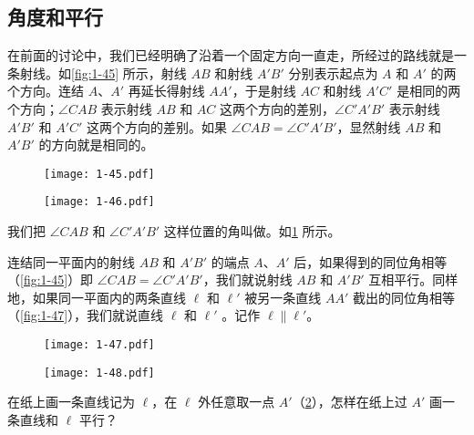\subsection{角度和平行}
在前面的讨论中，我们已经明确了沿着一个固定方向一直走，所经过的路线就是一条射线。如\cref{fig:1-45} 所示，射线 $AB$ 和射线 $A'B'$ 分别表示起点为 $A$ 和 $A'$ 的两个方向。连结 $A$、$A'$ 再延长得射线 $AA'$，于是射线 $AC$ 和射线 $A'C'$ 是相同的两个方向；$\angle CAB$ 表示射线 $AB$ 和 $AC$ 这两个方向的差别，$\angle C'A'B'$ 表示射线 $A'B'$ 和 $A'C'$ 这两个方向的差别。如果 $\angle CAB=\angle C'A'B'$，显然射线 $AB$ 和 $A'B'$ 的方向就是相同的。

\begin{figure}
	\begin{minipage}[b]{0.48\linewidth}
		\centering
    \texttt{[image: 1-45.pdf]}
		\caption{}\label{fig:1-45}
	\end{minipage}
	\begin{minipage}[b]{0.48\linewidth}
		\centering
		\texttt{[image: 1-46.pdf]}
		\caption{}\label{fig:1-46}
	\end{minipage}
\end{figure}


我们把 $\angle CAB$ 和 $\angle C'A'B'$ 这样位置的角叫做。如\cref{fig:1-46} 所示。

连结同一平面内的射线 $AB$ 和 $A'B'$ 的端点 $A$、$A'$ 后，如果得到的同位角相等（\cref{fig:1-45}）即 $\angle CAB=\angle C'A'B'$，我们就说射线 $AB$ 和 $A'B'$ 互相平行。同样地，如果同一平面内的两条直线 $\ell$ 和 $\ell'$ 被另一条直线 $AA'$ 截出的同位角相等（\cref{fig:1-47}），我们就说直线 $\ell$ 和 $\ell'$ 。记作 $\ell\parallel \ell'$。

\begin{figure}
    \begin{minipage}[b]{0.48\linewidth}
    	\centering
			\texttt{[image: 1-47.pdf]}
    	\caption{}\label{fig:1-47}
    \end{minipage}
    \begin{minipage}[b]{0.48\linewidth}
    	\centering
			\texttt{[image: 1-48.pdf]}
    \caption{}\label{fig:1-48}
  \end{minipage}
\end{figure}

\begin{example}
在纸上画一条直线记为 $\ell$，在 $\ell$ 外任意取一点 $A'$（\cref{fig:1-48}），怎样在纸上过 $A'$ 画一条直线和 $\ell$ 平行？
\end{example}

